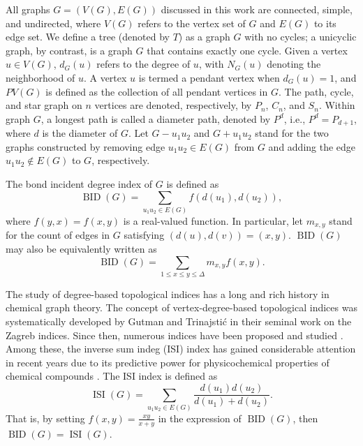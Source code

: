 \documentclass[12pt]{article}
\theoremstyle{definition}
\newcommand{\BID}{\operatorname{BID}}
\newcommand{\ISI}{\operatorname{ISI}}
\begin{document}
All graphs \(G = (V(G), E(G))\) discussed in this work are connected, simple, and undirected, where \(V(G)\) refers to the vertex set of \(G\) and \(E(G)\) to its edge set. We define a tree (denoted by \(T\)) as a graph \(G\) with no cycles; a unicyclic graph, by contrast, is a graph \(G\) that contains exactly one cycle. Given a vertex \(u \in V(G)\), \(d_G(u)\) refers to the degree of \(u\), with \(N_G(u)\) denoting the neighborhood of \(u\). A vertex \(u\) is termed a pendant vertex when \(d_G(u) = 1\), and \(PV(G)\) is defined as the collection of all pendant vertices in \(G\). The path, cycle, and star graph on \(n\) vertices are denoted, respectively, by \(P_n\), \(C_n\), and \(S_n\). Within graph \(G\), a longest path is called a diameter path, denoted by \(P^d\), i.e., \(P^d = P_{d+1}\), where \(d\) is the diameter of \(G\). Let \(G - u_1u_2\) and \(G + u_1u_2\) stand for the two graphs constructed by removing edge \(u_1u_2 \in E(G)\) from \(G\) and adding the edge \(u_1u_2 \notin E(G)\) to \(G\), respectively.

The bond incident degree index of \(G\) \cite{vukicevic2011bond} is defined as
\begin{equation}
\BID(G) = \sum_{u_1u_2 \in E(G)} f(d(u_1), d(u_2)),
\end{equation}
where \(f(y,x) = f(x,y)\) is a real-valued function. In particular, let \(m_{x,y}\) stand for the count of edges in \(G\) satisfying \((d(u), d(v)) = (x,y)\). \(\BID(G)\) may also be equivalently written as
\begin{equation}
\BID(G) = \sum_{1 \leq x \leq y \leq \Delta} m_{x,y} f(x,y).
\end{equation}

The study of degree-based topological indices has a long and rich history in chemical graph theory. The concept of vertex-degree-based topological indices was systematically developed by Gutman and Trinajstić \cite{gutman1972graph} in their seminal work on the Zagreb indices. Since then, numerous indices have been proposed and studied \cite{todeschini2000handbook, devillers1999topological}. Among these, the inverse sum indeg (ISI) index has gained considerable attention in recent years due to its predictive power for physicochemical properties of chemical compounds \cite{vukicevic2010bond, vukicevic2011bond}. The ISI index is defined as
\begin{equation}
\ISI(G) = \sum_{u_1u_2 \in E(G)} \frac{d(u_1) d(u_2)}{d(u_1) + d(u_2)}.
\end{equation}
That is, by setting \(f(x,y) = \frac{xy}{x+y}\) in the expression of \(\BID(G)\), then \(\BID(G) = \ISI(G)\).
\end{document}
